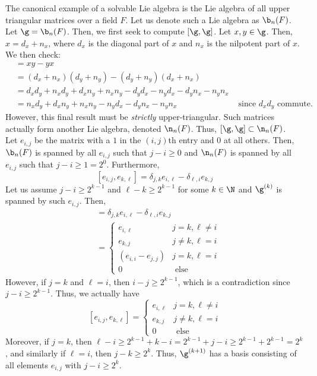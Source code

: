\documentclass[11pt,leqno,oneside]{amsart}
\numberwithin{thm}{section}
\begin{document}
\begin{example}
  The canonical example of a solvable Lie algebra is the Lie algebra
  of all upper triangular matrices over a field \(F\). Let us denote
  such a Lie algebra as \(\b_n(F)\). Let \(\g = \b_n(F)\). Then, we
  first seek to compute \([\g, \g]\). Let \(x,y \in \g\). Then, \(x =
  d_x + n_x\), where \(d_x\) is the diagonal part of \(x\) and \(n_x\)
  is the nilpotent part of \(x\). We then check:
  \begin{align*}
    [x,y] & = xy - yx \\
          & = (d_x+n_x)(d_y+n_y) - (d_y+n_y)(d_x+n_x) \\
    & = d_x d_y + n_x d_y + d_x n_y + n_x n_y - d_y d_x - n_y d_x -
      d_y n_x - n_y n_x \\
    & = n_x d_y + d_x n_y + n_x n_y - n_y d_x -
      d_y n_x - n_y n_x & \text{ since } d_x d_y \text{ commute.}
  \end{align*}
  However, this final result must be \emph{strictly}
  upper-triangular. Such matrices actually form another Lie algebra,
  denoted \(\n_n(F)\). Thus, \([\g,\g] \subset \n_n(F)\). \\

  Let \(e_{i,j}\) be the matrix with a \(1\) in the \((i,j)\)th entry
  and \(0\) at all others. Then, \(\b_n(F)\) is spanned by all
  \(e_{i,j}\) such that \(j-i \geq 0\) and \(\n_n(F)\) is spanned by
  all \(e_{i,j}\) such that \(j-i \geq 1 = 2^0\). Furthermore, \[
    [e_{i,j}, e_{k,\ell}] = \delta_{j,k} e_{i,\ell} - \delta_{\ell,i} e_{k,j}
  \]
  Let us assume \(j-i \geq 2^{k-1}\) and \(\ell-k \geq 2^{k-1}\) for
  some \(k \in \N\) and \(\g^{(k)}\) is spanned by such \(e_{i,j}\). Then,
  \begin{align*}
    [e_{i,j}, e_{k,\ell}]
    & = \delta_{j,k} e_{i,\ell} - \delta_{\ell,i} e_{k,j} \\
    & =
      \begin{cases}
        e_{i,\ell} & j=k, \ell \neq i
        \\
        e_{k,j} & j \neq k, \ell = i \\
        (e_{i,i} - e_{j,j}) & j = k, \ell = i \\
        0 & \text{ else }
      \end{cases}
  \end{align*}
  However, if \(j = k\) and \(\ell = i\), then \(i-j \geq 2^{k-1}\),
  which is a contradiction since \(j-i \geq 2^{k-1}\). Thus, we
  actually have \[
  [e_{i,j}, e_{k,\ell}] =
      \begin{cases}
        e_{i,\ell} & j=k, \ell \neq i
        \\
        e_{k,j} & j \neq k, \ell = i \\
        0 & \text{ else }
      \end{cases}
  \]
  Moreover, if \(j = k\), then \(\ell - i \geq 2^{k-1} + k - i =
  2^{k-1} + j - i \geq 2^{k-1} + 2^{k-1} = 2^k\), and similarly if
  \(\ell = i\), then \(j-k \geq 2^k\). Thus, \(\g^{(k+1)}\) has a basis
  consisting of all elements \(e_{i,j}\) with \(j-i \geq 2^k\). \\


\end{example}
\end{document}
